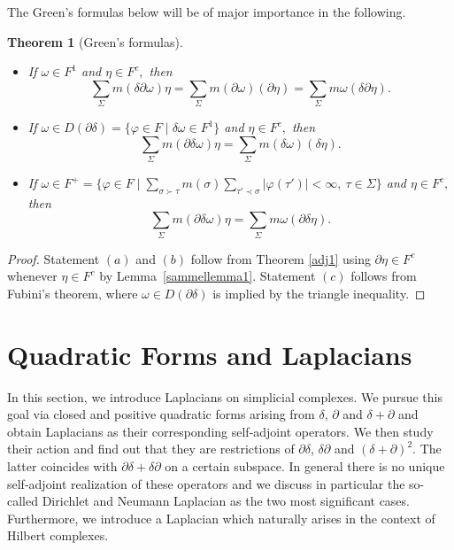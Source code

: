 \documentclass[10pt]{amsart}
\newtheorem{theorem}{Theorem}[section]
\theoremstyle{definition}
\newcommand{\F}{{F}}
\begin{document}
The  Green's formulas below will be of major importance in the following.%

\begin{theorem}[Green's formulas]\label{green1}
	\begin{itemize}
		\item [(a)] If $\omega\in \F^1$ and $\eta\in \F^c,$ then
		$$\sum_{\Sigma}m(\delta\partial\omega)\eta= \sum_{\Sigma}m(\partial\omega)(\partial\eta)= \sum_{\Sigma}m\omega(\delta\partial\eta).$$   
		\item [(b)] If $\omega\in D(\partial\delta) = \lbrace\varphi\in \F\mid\delta\omega\in \F^1\rbrace$ and $\eta\in \F^c,$ then 
		$$\sum_{\Sigma}m(\partial\delta\omega)\eta= \sum_{\Sigma}m(\delta\omega)(\delta\eta).$$
		\item [(c)] If $\omega\in F^{+}= \lbrace\varphi\in \F\mid\sum\limits_{\sigma\succ\tau}m(\sigma)\sum\limits_{\tau'\prec\sigma}\vert\varphi(\tau')\vert<\infty,~\tau\in\Sigma\rbrace$ and $\eta\in \F^c,$ then
		$$\sum_{\Sigma}m(\partial\delta\omega)\eta= \sum_{\Sigma}m\omega(\partial\delta\eta).$$
	\end{itemize}  
\end{theorem}
\begin{proof}
Statement $ (a)$ and $(b)$ follow from Theorem \ref{adj1} using $\partial\eta\in \F^c$ whenever $\eta\in \F^c$ by Lemma~\ref{sammellemma1}. Statement $(c)$ follows from Fubini's theorem, where $\omega\in D(\partial\delta)$ is implied by the triangle inequality.
\end{proof}



\section{Quadratic Forms and Laplacians}\label{quadform}

In this section, we introduce Laplacians on simplicial complexes. We pursue this goal via closed and positive quadratic forms arising from $\delta$, $\partial$ and $\delta+\partial$ and obtain Laplacians as their corresponding self-adjoint operators. We then study their action and find out that they are restrictions of $\partial\delta$, $\delta\partial$ and $(\delta+\partial)^{2}.$ The latter coincides with $\partial\delta+\delta\partial$ on a certain subspace. In general there is no unique self-adjoint realization of these operators and we discuss in particular the so-called Dirichlet and Neumann Laplacian as the two most significant cases. Furthermore, we introduce a Laplacian which naturally arises in the context of Hilbert complexes.
\end{document}
